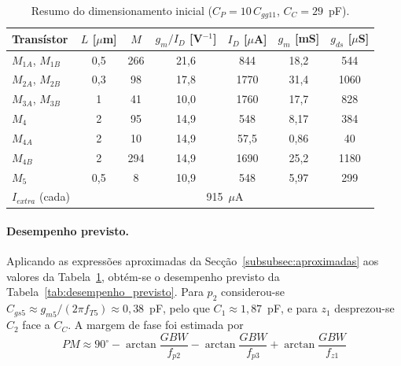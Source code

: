 \begin{table}[H]
    \centering
    \caption{Resumo do dimensionamento inicial ($C_P = 10\,C_{gg11}$, $C_C = 29$~pF).}
    \label{tab:resumo_dim}
    \begin{tabular}{lcccccc}
        \toprule
        Transístor & $L$ [$\mu$m] & $M$ & $g_m/I_D$ [V$^{-1}$] & $I_D$ [$\mu$A] & $g_m$ [mS] & $g_{ds}$ [$\mu$S] \\
        \midrule
        $M_{1A}$, $M_{1B}$ & 0,5 & 266 & 21,6 & 844  & 18,2 & 544 \\
        $M_{2A}$, $M_{2B}$ & 0,3 & 98  & 17,8 & 1770 & 31,4 & 1060 \\
        $M_{3A}$, $M_{3B}$ & 1   & 41  & 10,0 & 1760 & 17,7 & 828 \\
        $M_4$              & 2   & 95  & 14,9 & 548  & 8,17 & 384 \\
        $M_{4A}$           & 2   & 10  & 14,9 & 57,5 & 0,86 & 40  \\
        $M_{4B}$           & 2   & 294 & 14,9 & 1690 & 25,2 & 1180 \\
        $M_5$              & 0,5 & 8   & 10,9 & 548  & 5,97 & 299 \\
        \midrule
        $I_{extra}$ (cada) & \multicolumn{6}{c}{915~$\mu$A} \\
        \bottomrule
    \end{tabular}
\end{table}

\paragraph{Desempenho previsto.}
Aplicando as expressões aproximadas da Secção~\ref{subsubsec:aproximadas} aos valores da Tabela~\ref{tab:resumo_dim},
obtém-se o desempenho previsto da Tabela~\ref{tab:desempenho_previsto}. Para $p_2$ considerou-se
$C_{gs5} \approx g_{m5}/(2\pi f_{T5}) \approx 0{,}38$~pF, pelo que $C_1 \approx 1{,}87$~pF, e para $z_1$ desprezou-se
$C_2$ face a $C_C$. A margem de fase foi estimada por
\begin{equation}
    PM \approx 90^\circ - \arctan\frac{GBW}{f_{p2}} - \arctan\frac{GBW}{f_{p3}} + \arctan\frac{GBW}{f_{z1}}
\end{equation}

